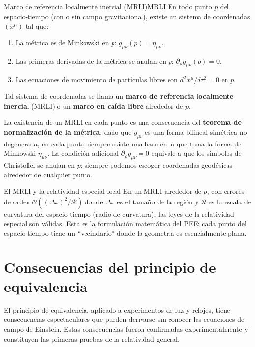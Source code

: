 \begin{definicion}{Marco de referencia localmente inercial (MRLI)}{MRLI}
En todo punto $p$ del espacio-tiempo (con o sin campo gravitacional), existe un sistema de coordenadas $(x^\mu)$ tal que:
\begin{enumerate}[leftmargin=2em]
  \item La métrica es de Minkowski en $p$: $g_{\mu\nu}(p) = \eta_{\mu\nu}$.
  \item Las primeras derivadas de la métrica se anulan en $p$: $\partial_\rho g_{\mu\nu}(p) = 0$.
  \item Las ecuaciones de movimiento de partículas libres son $d^2x^\mu/d\tau^2 = 0$ en $p$.
\end{enumerate}
Tal sistema de coordenadas se llama un \textbf{marco de referencia localmente inercial} (MRLI) o un \textbf{marco en caída libre} alrededor de $p$.
\end{definicion}

La existencia de un MRLI en cada punto es una consecuencia del \textbf{teorema de normalización de la métrica}: dado que $g_{\mu\nu}$ es una forma bilineal simétrica no degenerada, en cada punto siempre existe una base en la que toma la forma de Minkowski $\eta_{\mu\nu}$. La condición adicional $\partial_\rho g_{\mu\nu} = 0$ equivale a que los símbolos de Christoffel se anulan en $p$: siempre podemos escoger coordenadas geodésicas alrededor de cualquier punto.

\begin{observacion}{El MRLI y la relatividad especial local}{}
En un MRLI alrededor de $p$, con errores de orden $\mathcal{O}((\Delta x)^2/\mathcal{R})$ donde $\Delta x$ es el tamaño de la región y $\mathcal{R}$ es la escala de curvatura del espacio-tiempo (radio de curvatura), las leyes de la relatividad especial son válidas. Esta es la formulación matemática del PEE: cada punto del espacio-tiempo tiene un ``vecindario'' donde la geometría es esencialmente plana.
\end{observacion}

\section{Consecuencias del principio de equivalencia}
\label{sec:consecuencias_PE}

El principio de equivalencia, aplicado a experimentos de luz y relojes, tiene consecuencias espectaculares que pueden derivarse sin conocer las ecuaciones de campo de Einstein. Estas consecuencias fueron confirmadas experimentalmente y constituyen las primeras pruebas de la relatividad general.

